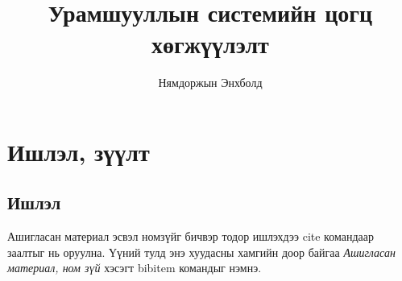 \documentclass[12pt,A4]{report}
\begin{document}

\title{Урамшууллын системийн цогц хөгжүүлэлт}
\author{Нямдоржын Энхболд}








% 




\chapter{Ишлэл, зүүлт}
\section{Ишлэл}
Ашигласан материал эсвэл номзүйг бичвэр тодор ишлэхдээ cite командаар заалтыг нь оруулна. 
Үүний тулд энэ хуудасны хамгийн доор байгаа \textit{Ашигласан материал, ном зүй} хэсэгт 
bibitem командыг нэмнэ. \\
\end{document}
